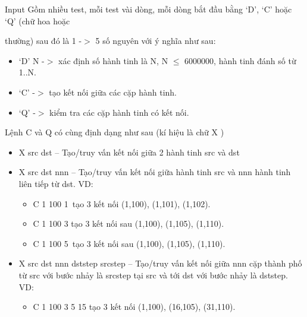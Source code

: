 Input
Gồm nhiều test, mỗi test vài dòng, mỗi dòng bắt đầu bằng ‘D’, ‘C’ hoặc ‘Q’ (chữ hoa hoặc

thường) sau đó là 1 -$>$ 5 số nguyên với ý nghĩa như sau:
\begin{itemize}
	\item ‘D’ N -$>$ xác định số hành tinh là N, N $\le$ 6000000, hành tinh đánh số từ 1..N.
	\item ‘C’ -$>$ tạo kết nối giữa các cặp hành tinh.
	\item ‘Q’ -$>$ kiểm tra các cặp hành tinh có kết nối.
\end{itemize}

Lệnh C và Q có cùng định dạng như sau (kí hiệu là chữ X )
\begin{itemize}
	\item X src dst – Tạo/truy vấn kết nối giữa 2 hành tinh src và dst
	\item X src dst nnn – Tạo/truy vấn kết nối giữa hành tinh src và nnn hành tinh liên tiếp từ dst. VD:
\begin{itemize}
	\item C 1 100 1 tạo 3 kết nối (1,100), (1,101), (1,102).
	\item C 1 100 3 tạo 3 kết nối sau (1,100), (1,105), (1,110).
	\item C 1 100 5 tạo 3 kết nối sau (1,100), (1,105), (1,110).
\end{itemize}
	\item X src dst nnn dststep srcstep – Tạo/truy vấn kết nối giữa nnn cặp thành phố từ src với bước nhảy là srcstep tại src và tới dst với bước nhảy là dststep. VD:
\begin{itemize}
	\item C 1 100 3 5 15 tạo 3 kết nối (1,100), (16,105), (31,110).
\end{itemize}
\end{itemize}